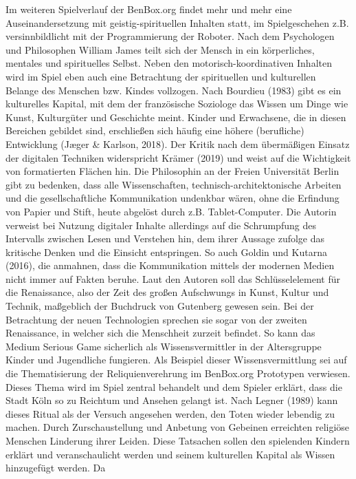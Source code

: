 \documentclass[
  a4paper,
  DIV=11,
  numbers=noendperiod,
  onecolumn,
  oneside,
  a4paper]{scrartcl}
\begin{document}
Im weiteren Spielverlauf der BenBox.org findet mehr und mehr eine
Auseinandersetzung mit geistig-spirituellen Inhalten statt, im
Spielgeschehen z.B. versinnbildlicht mit der Programmierung der Roboter.
Nach dem Psychologen und Philosophen William James teilt sich der Mensch
in ein körperliches, mentales und spirituelles Selbst. Neben den
motorisch-koordinativen Inhalten wird im Spiel eben auch eine
Betrachtung der spirituellen und kulturellen Belange des Menschen bzw.
Kindes vollzogen. Nach Bourdieu (1983) gibt es ein kulturelles Kapital,
mit dem der französische Soziologe das Wissen um Dinge wie Kunst,
Kulturgüter und Geschichte meint. Kinder und Erwachsene, die in diesen
Bereichen gebildet sind, erschließen sich häufig eine höhere
(berufliche) Entwicklung (Jæger \& Karlson, 2018). Der Kritik nach dem
übermäßigen Einsatz der digitalen Techniken widerspricht Krämer (2019)
und weist auf die Wichtigkeit von formatierten Flächen hin. Die
Philosophin an der Freien Universität Berlin gibt zu bedenken, dass alle
Wissenschaften, technisch-architektonische Arbeiten und die
gesellschaftliche Kommunikation undenkbar wären, ohne die Erfindung von
Papier und Stift, heute abgelöst durch z.B. Tablet-Computer. Die Autorin
verweist bei Nutzung digitaler Inhalte allerdings auf die Schrumpfung
des Intervalls zwischen Lesen und Verstehen hin, dem ihrer Aussage
zufolge das kritische Denken und die Einsicht entspringen. So auch
Goldin und Kutarna (2016), die anmahnen, dass die Kommunikation mittels
der modernen Medien nicht immer auf Fakten beruhe. Laut den Autoren soll
das Schlüsselelement für die Renaissance, also der Zeit des großen
Aufschwungs in Kunst, Kultur und Technik, maßgeblich der Buchdruck von
Gutenberg gewesen sein. Bei der Betrachtung der neuen Technologien
sprechen sie sogar von der zweiten Renaissance, in welcher sich die
Menschheit zurzeit befindet. So kann das Medium Serious Game sicherlich
als Wissensvermittler in der Altersgruppe Kinder und Jugendliche
fungieren. Als Beispiel dieser Wissensvermittlung sei auf die
Thematisierung der Reliquienverehrung im BenBox.org Prototypen
verwiesen. Dieses Thema wird im Spiel zentral behandelt und dem Spieler
erklärt, dass die Stadt Köln so zu Reichtum und Ansehen gelangt ist.
Nach Legner (1989) kann dieses Ritual als der Versuch angesehen werden,
den Toten wieder lebendig zu machen. Durch Zurschaustellung und Anbetung
von Gebeinen erreichten religiöse Menschen Linderung ihrer Leiden. Diese
Tatsachen sollen den spielenden Kindern erklärt und veranschaulicht
werden und seinem kulturellen Kapital als Wissen hinzugefügt werden. Da
\end{document}
